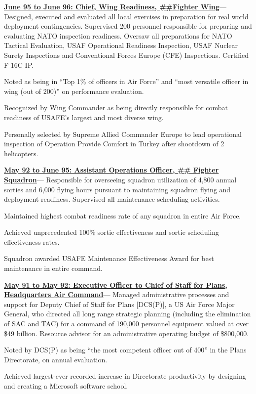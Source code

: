 \documentclass[9pt,letterpaper]{scrartcl}
\newenvironment{accomplishments}{%
	\begin{list}{\textbullet}{%
        \setlength\leftmargin{1em}      %
        \setlength\topsep{0ex}          %
        \setlength\parskip{0.5ex}
        \setstretch{0.8}
        \setlength\listparindent{1em}   %
        \setlength\parsep{0in}          %
        \setlength\itemsep{0.5ex}         %
        }
}{
	\end{list}
}
\newcommand{\accomplishment}{\item }
\newenvironment{job}[4]{%
\vspace{0.0em}
\noindent\textbf{\underline{{#1: #2\ifthenelse{\isempty{#3}}{}{, #3}}}}---#4%
\noindent\begin{accomplishments}{}
}{
\end{accomplishments}
\vspace{1.5em}
}
\begin{document}
\begin{job}{June 95 to June 96}{Chief, Wing Readiness, \#\#Fighter Wing}{}{%
Designed, executed and evaluated all local exercises in preparation
for real world deployment contingencies. Supervised 200 personnel responsible for preparing and evaluating NATO inspection
readiness. Oversaw all preparations for NATO Tactical Evaluation, USAF Operational Readiness Inspection, USAF Nuclear Surety
Inspections and Conventional Forces Europe (CFE) Inspections. Certified F-16C IP.
}
\accomplishment Noted as being in ``Top 1\% of officers in Air Force'' and ``most versatile officer in wing (out of 200)'' on performance evaluation.
\accomplishment Recognized by Wing Commander as being directly responsible for combat readiness of USAFE's largest and most diverse wing.
\accomplishment Personally selected by Supreme Allied Commander Europe to lead operational inspection of Operation Provide Comfort in Turkey
after shootdown of 2 helicopters.
\end{job}

\begin{job}{May 92 to June 95}{Assistant Operations Officer, \#\# Fighter Squadron}{USAFB}{%
Responsible for overseeing squadron
utilization of 4,800 annual sorties and 6,000 flying hours pursuant to maintaining squadron flying and deployment readiness.
Supervised all maintenance scheduling activities.
}
\accomplishment Maintained highest combat readiness rate of any squadron in entire Air Force.
\accomplishment Achieved unprecedented 100\% sortie effectiveness and sortie scheduling effectiveness rates.
\accomplishment Squadron awarded USAFE Maintenance Effectiveness Award for best maintenance in entire command.
\end{job}

\begin{job}{May 91 to May 92}{Executive Officer to Chief of Staff for Plans, Headquarters Air Command}{}{%
Managed administrative
processes and support for Deputy Chief of Staff for Plans [DCS(P)], a US Air Force Major General, who directed all long range
strategic planning (including the elimination of SAC and TAC) for a command of 190,000 personnel equipment valued at over \$49
billion. Resource advisor for an administrative operating budget of \$800,000.
}
\accomplishment Noted by DCS(P) as being ``the most competent officer out of 400'' in the Plans Directorate, on annual evaluation.
\accomplishment Achieved largest-ever recorded increase in Directorate productivity by designing and creating a Microsoft software school.
\end{job}
\end{document}

